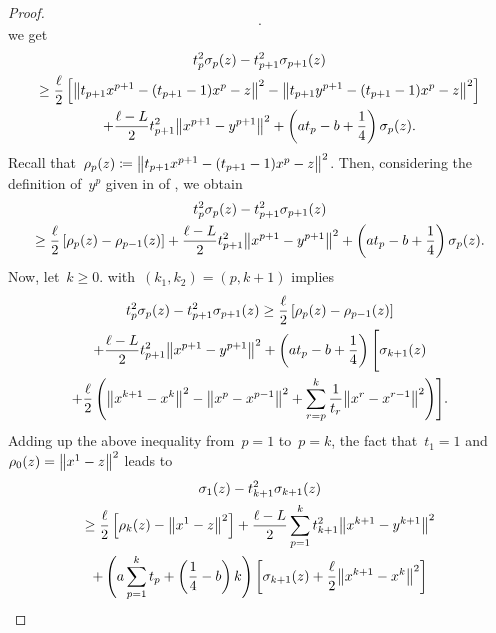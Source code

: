 \documentclass[../main]{subfiles}
\begin{document}
\begin{proof}
\begin{equation}
    .\end{equation}
    we get
    \begin{multline}
        t_p^2 \sigma_p(z) - t_{p + 1}^2 \sigma_{p + 1}(z) \\
        \ge \frac{\ell}{2} \left[ \norm*{t_{p + 1} x^{p + 1} - (t_{p + 1} - 1) x^p - z}^2 - \norm*{t_{p + 1} y^{p + 1} - (t_{p + 1} - 1) x^p - z}^2 \right] \\
        + \frac{\ell - L}{2} t_{p + 1}^2 \norm*{x^{p + 1} - y^{p + 1}}^2 + \left( a t_p - b + \frac{1}{4} \right) \sigma_p(z)
    .\end{multline}
    Recall that~$\rho_p(z) \coloneqq \norm*{t_{p + 1} x^{p + 1} - (t_{p + 1} - 1) x^p - z}^2$.
    Then, considering the definition of~$y^p$ given in  of , we obtain
    \begin{multline}
        t_p^2 \sigma_p(z) - t_{p + 1}^2 \sigma_{p + 1}(z) \\
        \ge \frac{\ell}{2} \left[ \rho_p(z) - \rho_{p - 1}(z) \right] + \frac{\ell - L}{2} t_{p + 1}^2 \norm*{x^{p + 1} - y^{p + 1}}^2 + \left( a t_p - b + \frac{1}{4} \right) \sigma_p(z)
    .\end{multline}
    Now, let~$k \ge 0$.
     with~$(k_1, k_2) = (p, k + 1)$ implies
    \begin{multline}
        t_p^2 \sigma_p(z) - t_{p + 1}^2 \sigma_{p + 1}(z) \ge \frac{\ell}{2} \left[ \rho_p(z) - \rho_{p - 1}(z) \right] \\
        + \frac{\ell - L}{2} t_{p + 1}^2 \norm*{x^{p + 1} - y^{p + 1}}^2 + \left( a t_p - b + \frac{1}{4} \right) \Biggl[ \sigma_{k + 1}(z) \\
        + \frac{\ell}{2} \left( \norm*{x^{k + 1} - x^k}^2 - \norm*{x^p - x^{p - 1}}^2 + \sum_{r = p}^k \frac{1}{t_r} \norm*{x^r - x^{r - 1}}^2 \right) \Biggr]
    .\end{multline}
    Adding up the above inequality from~$p = 1$ to~$p = k$, the fact that~$t_1 = 1$ and~$\rho_0(z) = \norm*{x^1 - z}^2$ leads to
    \begin{multline} \label{eq:key relation tmp}
        \sigma_1(z) - t_{k + 1}^2 \sigma_{k + 1}(z) \\
        \ge \frac{\ell}{2} \left[ \rho_{k}(z) - \norm*{x^1 - z}^2 \right] + \frac{\ell - L}{2} \sum_{p = 1}^k t_{k + 1}^2 \norm*{x^{k + 1} - y^{k + 1}}^2 \\
        + \left( a \sum_{p = 1}^{k} t_p + \left( \frac{1}{4} - b \right) k \right) \left[ \sigma_{k + 1}(z) + \frac{\ell}{2} \norm*{x^{k + 1} - x^k}^2 \right] \\

\end{multline}
\end{proof}
\end{document}
